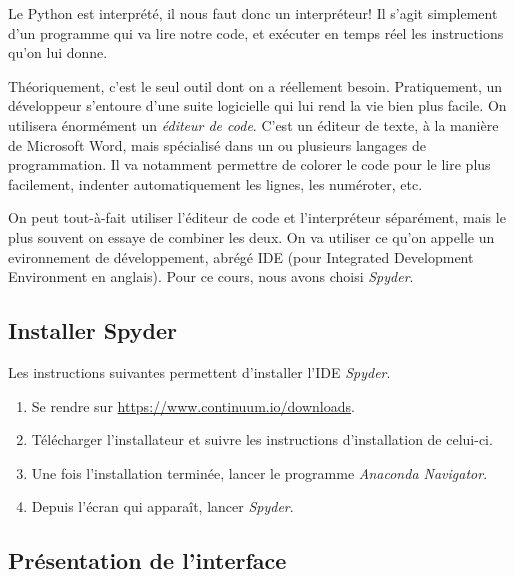 Le Python est interprété, il nous faut donc un interpréteur! Il s'agit simplement d'un programme qui va lire notre code, et exécuter en temps réel les instructions qu'on lui donne.

Théoriquement, c'est le seul outil dont on a réellement besoin. Pratiquement, un développeur s'entoure d'une suite logicielle qui lui rend la vie bien plus facile. On utilisera énormément un \textit{éditeur de code}. C'est un éditeur de texte, à la manière de Microsoft Word, mais spécialisé dans un ou plusieurs langages de programmation. Il va notamment permettre de colorer le code pour le lire plus facilement, indenter automatiquement les lignes, les numéroter, etc.

On peut tout-à-fait utiliser l'éditeur de code et l'interpréteur séparément, mais le plus souvent on essaye de combiner les deux. On va utiliser ce qu'on appelle un evironnement de développement, abrégé IDE (pour Integrated Development Environment en anglais). Pour ce cours, nous avons choisi \textit{Spyder}.

\subsection{Installer Spyder}

Les instructions suivantes permettent d'installer l'IDE \textit{Spyder}.

\begin{enumerate}
    \item Se rendre sur \url{https://www.continuum.io/downloads}.
    \item Télécharger l'installateur et suivre les instructions d'installation de celui-ci.
    \item Une fois l'installation terminée, lancer le programme \textit{Anaconda Navigator}.
    \item Depuis l'écran qui apparaît, lancer \textit{Spyder}.
\end{enumerate}

\subsection{Présentation de l'interface}

